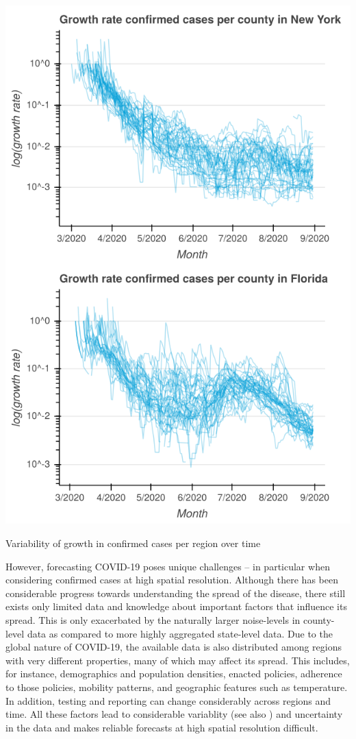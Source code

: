 \documentclass[nobib]{tufte-handout}
\begin{document}
\begin{marginfigure}[-7em]

\includegraphics[width=\columnwidth]{img/growth_example.png}
\caption{\label{fig:county-variability}Variability of growth in confirmed cases per region over time}
\end{marginfigure}

However, forecasting COVID-19 poses unique challenges -- in particular when
considering confirmed cases at high spatial resolution. Although there has been
considerable progress towards understanding the spread of the disease, there
still exists only limited data and knowledge about important factors that
influence its spread. This is only exacerbated by the naturally larger
noise-levels in county-level data as compared to more highly aggregated state-level
data. Due to the global nature of COVID-19, the available data is also
distributed among regions with very different properties, many of which may
affect its spread. This includes, for instance, demographics and population
densities, enacted policies, adherence to those policies, mobility patterns, and
geographic features such as temperature. In addition, testing and reporting can
change considerably across regions and time. All these factors lead to
considerable variablity (see also ) and uncertainty in
the data and makes reliable forecasts at high spatial resolution difficult.
\end{document}
